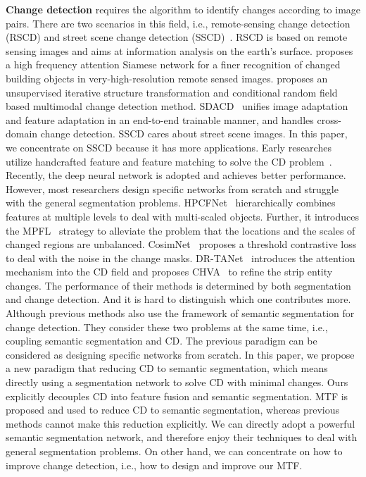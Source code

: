 \documentclass[review]{elsarticle}
\begin{document}
\textbf{Change detection} requires the algorithm to identify changes according to image pairs. There are two scenarios in this field, i.e., remote-sensing change detection (RSCD) \cite{RSCD} and street scene change detection (SSCD)~\cite{PCD,VL_CMU_CD,changesim}. RSCD is based on remote sensing images and aims at information analysis on the earth's surface. \cite{ZHENG2022108717} proposes a high frequency attention Siamese network for a finer recognition of changed building objects in very-high-resolution remote sensed images. \cite{SUN2022108845} proposes an unsupervised iterative structure transformation and conditional random field based multimodal change detection method. SDACD~\cite{LIU2022108960} unifies image adaptation and feature adaptation in an end-to-end trainable manner, and handles cross-domain change detection. SSCD cares about street scene images. In this paper, we concentrate on SSCD because it has more applications. Early researches utilize handcrafted feature and feature matching to solve the CD problem~\cite{CD_survey,DOF}. Recently, the deep neural network is adopted and achieves better performance. However, most researchers design specific networks from scratch and struggle with the general segmentation problems. HPCFNet~\cite{HPCFNet} hierarchically combines features at multiple levels to deal with multi-scaled objects. Further, it introduces the MPFL~\cite{HPCFNet} strategy to alleviate the problem that the locations and the scales of changed regions are unbalanced. CosimNet~\cite{CosimNet} proposes a threshold contrastive loss to deal with the noise in the change masks. DR-TANet~\cite{DR_TANet} introduces the attention mechanism into the CD field and proposes CHVA~\cite{DR_TANet} to refine the strip entity changes. The performance of their methods is determined by both segmentation and change detection. And it is hard to distinguish which one contributes more. Although previous methods also use the framework of semantic segmentation for change detection. They consider these two problems at the same time, i.e., coupling semantic segmentation and CD. The previous paradigm can be considered as designing specific networks from scratch. In this paper, we propose a new paradigm that reducing CD to semantic segmentation, which means directly using a segmentation network to solve CD with minimal changes. Ours explicitly decouples CD into feature fusion and semantic segmentation. MTF is proposed and used to reduce CD to semantic segmentation, whereas previous methods cannot make this reduction explicitly. We can directly adopt a powerful semantic segmentation network, and therefore enjoy their techniques to deal with general segmentation problems. On other hand, we can concentrate on how to improve change detection, i.e., how to design and improve our MTF.
\end{document}
